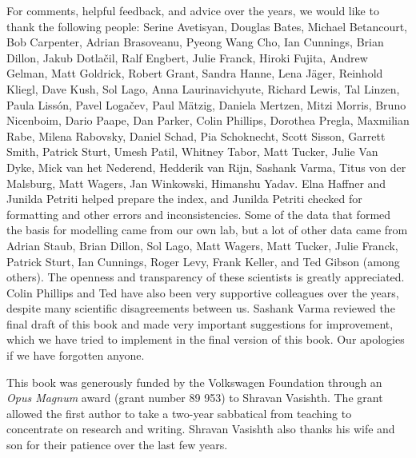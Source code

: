 For comments, helpful feedback, and advice over the years, we would like to thank the following people: 
Serine Avetisyan,
Douglas Bates, 
Michael Betancourt, 
Bob Carpenter, 
Adrian Brasoveanu, 
Pyeong Wang Cho,
Ian Cunnings,
Brian Dillon,
Jakub Dotla\v cil,
Ralf Engbert, 
Julie Franck,
Hiroki Fujita, 
Andrew Gelman, 
Matt Goldrick,
Robert Grant,
Sandra Hanne,
Lena J\"ager,
Reinhold Kliegl, 
Dave Kush,
Sol Lago,
Anna Laurinavichyute,
Richard Lewis, 
Tal Linzen, 
Paula Liss\'on,
Pavel Loga{\v c}ev,
Paul M\"atzig,
Daniela Mertzen,
Mitzi Morris, 
Bruno Nicenboim,
Dario Paape,
Dan Parker,
Colin Phillips,
Dorothea Pregla,
Maxmilian Rabe, 
Milena Rabovsky, 
Daniel Schad,
Pia  Schoknecht, 
Scott Sisson, 
Garrett Smith,
Patrick Sturt,
Umesh Patil,
Whitney Tabor,
Matt Tucker,
Julie Van Dyke,
Mick van het Nederend,
Hedderik van Rijn,
Sashank Varma, 
Titus von der Malsburg,
Matt Wagers,
Jan Winkowski,
Himanshu Yadav. Elna Haffner and Junilda Petriti helped prepare the index, and Junilda Petriti checked for formatting and other errors and inconsistencies. 
Some of the data that formed the basis for modelling came from our own lab, but a lot of other data came from Adrian Staub, Brian Dillon, Sol Lago, Matt Wagers, Matt Tucker, Julie Franck, Patrick Sturt, Ian Cunnings, Roger Levy, Frank Keller, and Ted Gibson (among others). The openness and transparency of these scientists is greatly appreciated. Colin Phillips and Ted have also been very supportive colleagues over the years, despite many scientific disagreements between us. Sashank Varma reviewed the final draft of this book and made very important suggestions for improvement, which we have tried to implement in the final version of this book. Our apologies if we have forgotten anyone.

This book was generously funded by the Volkswagen Foundation through an \textit{Opus Magnum} award (grant number 89 953) to Shravan Vasishth. The grant  allowed the first author to take a two-year sabbatical from teaching to concentrate on research and writing. Shravan Vasishth also thanks his wife and son for their patience  over the last few years.
